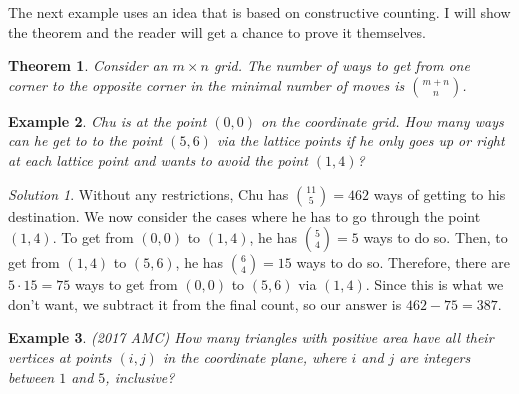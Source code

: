 \documentclass[letterpaper]{article}
\newtheorem{thm}{Theorem}[section]
\newtheorem{example}[thm]{Example}
\theoremstyle{remark}
\newtheorem*{solution}{Solution}
\theoremstyle{definition}
\begin{document}
The next example uses an idea that is based on constructive counting. I will show the theorem and the reader will get a chance to prove it themselves.

\bigskip


\begin{mdframed}
\begin{thm}
Consider an $m \times n$ grid. The number of ways to get from one corner to the opposite corner in the minimal number of moves is $\binom{m+n}{n}$.
\end{thm}
\end{mdframed}

\bigskip

\begin{example}
Chu is at the point $(0,0)$ on the coordinate grid. How many ways can he get to to the point $(5,6)$ via the lattice points if he only goes up or right at each lattice point and wants to avoid the point $(1,4)$?
\end{example}

\begin{solution}
Without any restrictions, Chu has $\binom{11}{5}=462$ ways of getting to his destination. We now consider the cases where he has to go through the point $(1,4).$ To get from $(0,0)$ to $(1,4)$, he has $\binom{5}{4}=5$ ways to do so. Then, to get from $(1,4)$ to $(5,6)$, he has $\binom{6}{4}=15$ ways to do so. Therefore, there are $5\cdot 15=75$ ways to get from $(0,0)$ to $(5,6)$ via $(1,4)$. Since this is what we don't want, we subtract it from the final count, so our answer is $462-75=387$.
\end{solution}

\bigskip


\begin{example}
(2017 AMC) How many triangles with positive area have all their vertices at points $(i,j)$ in the coordinate plane, where $i$ and $j$ are integers between $1$ and $5$, inclusive?
\end{example}
\end{document}
